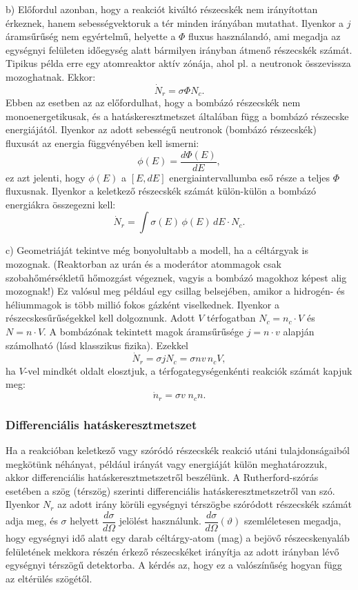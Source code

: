 \documentclass[../main.tex]{subfiles}
\begin{document}
b) Előfordul azonban, hogy a reakciót kiváltó részecskék nem irányítottan
érkeznek, hanem sebességvektoruk a tér minden irányában mutathat.
Ilyenkor a $j$ áram­sűrűség nem egyértelmű, helyette a $\Phi$ fluxus
használandó, ami megadja az egységnyi felületen időegység alatt
bármilyen irányban átmenő részecskék számát.
Tipikus példa erre egy atomreaktor aktív zónája, ahol pl. a neutronok
összevissza mozoghatnak.
Ekkor:
\[
\dot{N}_r=\sigma \Phi N_c.
\]
Ebben az esetben az az előfordulhat, hogy a bombázó részecskék nem
monoenergetikusak, és a hatáskeresztmetszet általában függ a bombázó
részecske energiájától.
Ilyenkor az adott sebességű neutronok (bombázó részecskék) fluxusát az
energia függvényében kell ismerni:
\[
\phi(E)=\frac{d\Phi(E)}{dE},
\]
ez azt jelenti, hogy $\phi(E)$ a $[E,dE]$ energiaintervallumba eső része
a teljes $\Phi$ fluxusnak.
Ilyenkor a keletkező részecskék számát külön-külön a bombázó energiákra
összegezni kell:
\[
\dot{N}_r=\int \sigma(E)\,\phi(E)\,dE\cdot N_c.
\]

c) Geometriáját tekintve még bonyolultabb a modell, ha a céltárgyak
is mozognak.
(Reaktorban az urán és a moderátor atommagok csak szobahőmérsékletű
hőmozgást végeznek, vagyis a bombázó magokhoz képest alig mozognak!)
Ez valósul meg például egy csillag belsejében, amikor a hidrogén- és
héliummagok is több millió fokos gázként viselkednek.
Ilyenkor a részecskesűrűségekkel kell dolgoznunk.
Adott $V$ térfogatban $N_c=n_c\cdot V$ és $N=n\cdot V$.
A bombázónak tekintett magok áramsűrűsége $j=n\cdot v$ alapján számolható
(lásd klasszikus fizika).
Ezekkel
\[
\dot{N}_r=\sigma j N_c=\sigma n v\, n_c V,
\]
ha $V$-vel mindkét oldalt elosztjuk, a térfogategységenkénti reakciók
számát kapjuk meg:
\[
\dot{n}_r=\sigma v\; n_c n.
\]

\subsubsection*{Differenciális hatáskeresztmetszet}

Ha a reakcióban keletkező vagy szóródó részecskék reakció utáni
tulajdonságaiból megkötünk néhányat, például irányát vagy energiáját
külön meghatározzuk, akkor differenciális hatáskeresztmetszetről
beszélünk.
A Rutherford-szórás esetében a szög (térszög) szerinti differenciális
hatáskeresztmetszetről van szó.
Ilyenkor $N_r$ az adott irány körüli egységnyi térszögbe szóródott
részecskék számát adja meg, és $\sigma$ helyett
$\dfrac{d\sigma}{d\Omega}$ jelölést használunk.
$\dfrac{d\sigma}{d\Omega}(\vartheta)$ szemléletesen megadja, hogy
egységnyi idő alatt egy darab céltárgy-atom (mag) a bejövő részecskenyaláb
felületének mekkora részén érkező részecskéket irányítja az adott
irányban lévő egységnyi térszögű detektorba.
A kérdés az, hogy ez a valószínűség hogyan függ az eltérülés szögétől.
\end{document}

